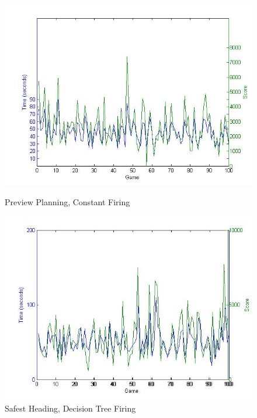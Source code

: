 \documentclass[10pt,final,conference]{IEEEtran}
\begin{document}
\begin{figure}[ht]
\centering
\begin{minipage}[b]{0.45\linewidth}
\includegraphics[width=1\textwidth]{previewConstant}
\caption{Preview Planning, Constant Firing}
\label{fig:previewtConstant}
\end{minipage}
\quad
\begin{minipage}[b]{0.45\linewidth}
\includegraphics[width=1\textwidth]{safestDecision}
\caption{Safest Heading, Decision Tree Firing}
\label{fig:safestDecision}
\end{minipage}
\end{figure}
\end{document}
